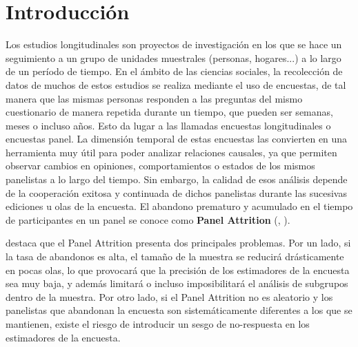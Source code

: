 \chapter{Introducción}
\label{chapter:introduccion}

Los estudios longitudinales son proyectos de investigación en los que se hace un seguimiento a un grupo de unidades muestrales (personas, hogares...) a lo largo de un período de tiempo. En el ámbito de las ciencias sociales, la recolección de datos de muchos de estos estudios se realiza mediante el uso de encuestas, de tal manera que las mismas personas responden a las preguntas del mismo cuestionario de manera repetida durante un tiempo, que pueden ser semanas, meses o incluso años. Esto da lugar a las llamadas encuestas longitudinales o encuestas panel. La dimensión temporal de estas encuestas las convierten en una herramienta muy útil para poder analizar relaciones causales, ya que permiten observar cambios en opiniones, comportamientos o estados de los mismos panelistas a lo largo del tiempo. Sin embargo, la calidad de esos análisis depende de la cooperación exitosa y continuada de dichos panelistas durante las sucesivas ediciones u olas de la encuesta. El abandono prematuro y acumulado en el tiempo de participantes en un panel se conoce como \textbf{Panel Attrition} (\cite{binder1998longitudinal}, \cite{watson2009identifying}).

\cite{lynn2018tackling} destaca que el Panel Attrition presenta dos principales problemas. Por un lado, si la tasa de abandonos es alta, el tamaño de la muestra se reducirá drásticamente en pocas olas, lo que provocará que la precisión de los estimadores de la encuesta sea muy baja, y además limitará o incluso imposibilitará el análisis de subgrupos dentro de la muestra. Por otro lado, si el Panel Attrition no es aleatorio y los panelistas que abandonan la encuesta son sistemáticamente diferentes a los que se mantienen, existe el riesgo de introducir un sesgo de no-respuesta en los estimadores de la encuesta.

